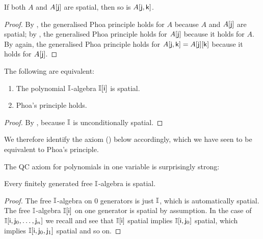 \begin{corollary}\label{cor:A-and-Ax-qc-to-Axy-qc}
  If both $A$ and $A[\mathsf{j}]$ are spatial, then so is $A[\mathsf{j},\mathsf{k}]$.
\end{corollary}
\begin{proof}
  By , the generalised Phoa principle holds for $A$ because $A$ and $A[\mathsf{j}]$ are spatial; by , the generalised Phoa principle holds for $A[\mathsf{j}]$ because it holds for $A$.  By  again, the generalised Phoa principle holds for $A[\mathsf{j},\mathsf{k}] = A[\mathsf{j}][\mathsf{k}]$ because it holds for $A[\mathsf{j}]$.
\end{proof}

\begin{corollary}\label{cor:phoa-vs-quasicoherence}
  The following are equivalent:
  \begin{enumerate}
    \item The polynomial $\mathbb{I}$-algebra $\mathbb{I}[\mathsf{i}]$ is spatial.
    \item Phoa's principle holds.
  \end{enumerate}
\end{corollary}

\begin{proof}
  By , because $\mathbb{I}$ is unconditionally spatial.
\end{proof}


We therefore identify the axiom (\AxiomSQCP) below accordingly, which we have seen to be equivalent to Phoa's principle.

\PrintAxiomSQCP


The \gls{QC} axiom for polynomials in one variable is surprisingly strong:

\begin{lemma}[\AxiomSQCP]\label{lem:fg-qc}
  Every finitely generated free $\mathbb{I}$-algebra is spatial.
\end{lemma}

\begin{proof}
  The free $\mathbb{I}$-algebra on $0$ generators is just $\mathbb{I}$, which is automatically spatial. The free $\mathbb{I}$-algebra $\mathbb{I}[\mathsf{i}]$ on one generator is spatial by assumption. In the case of $\mathbb{I}[\mathsf{i},\mathsf{j}_0,\ldots,\mathsf{j}_n]$ we recall  and see that $\mathbb{I}[\mathsf{i}]$ spatial implies $\mathbb{I}[\mathsf{i},\mathsf{j}_0]$ spatial, which implies $\mathbb{I}[\mathsf{i},\mathsf{j}_0,\mathsf{j}_1]$ spatial and so on.
\end{proof}


